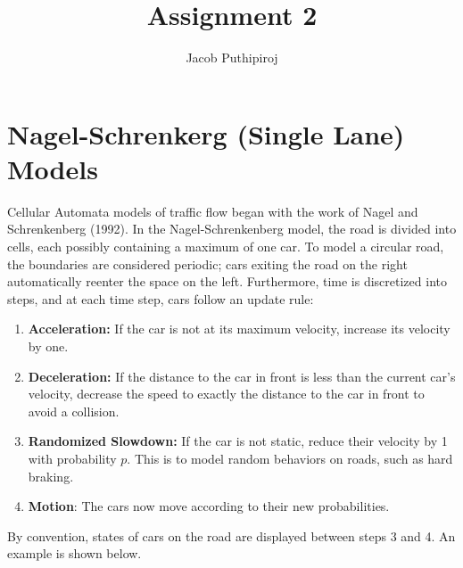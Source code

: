 \documentclass{article}
\begin{document}
\title{Assignment 2}
\author{Jacob Puthipiroj}
\maketitle

\section*{Nagel-Schrenkerg (Single Lane) Models }


Cellular Automata models of traffic flow began with the work of Nagel and Schrenkenberg (1992). In the Nagel-Schrenkenberg model, the road is divided into cells, each possibly containing a maximum of one car. To model a circular road, the boundaries are considered periodic; cars exiting the road on the right automatically reenter the space on the left. Furthermore, time is discretized into steps, and at each time step, cars follow an update rule:
\begin{enumerate}[itemsep=0.1pt]
\item \textbf{Acceleration:} If the car is not at its maximum velocity, increase its velocity by one.
\item \textbf{Deceleration:} If the distance to the car in front is less than the current car's velocity, decrease the speed to exactly the distance to the car in front to avoid a collision.
\item \textbf{Randomized Slowdown:} If the car is not static, reduce their velocity by 1 with probability $p$. This is to model random behaviors on roads, such as hard braking.
\item \textbf{Motion}: The cars now move according to their new probabilities.
\end{enumerate}
By convention, states of cars on the road are displayed between steps 3 and 4. An example is shown below. 
\end{document}
